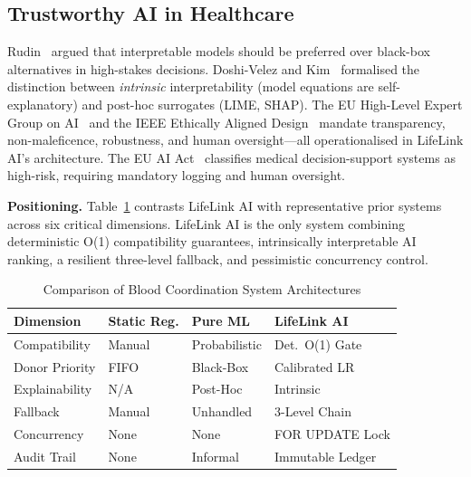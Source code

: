 \documentclass[conference]{IEEEtran}
\begin{document}
\subsection{Trustworthy AI in Healthcare}
Rudin~\cite{rudin2019} argued that interpretable models should be
preferred over black-box alternatives in high-stakes decisions.
Doshi-Velez and Kim~\cite{doshivelez2017} formalised the distinction
between \emph{intrinsic} interpretability (model equations are
self-explanatory) and post-hoc surrogates (LIME, SHAP). The EU
High-Level Expert Group on AI~\cite{eu_hleg2019} and the IEEE
Ethically Aligned Design~\cite{ieee_ead2019} mandate transparency,
non-maleficence, robustness, and human oversight---all operationalised
in LifeLink AI's architecture. The EU AI Act~\cite{eu_ai_act2021}
classifies medical decision-support systems as high-risk, requiring
mandatory logging and human oversight.

\textbf{Positioning.} Table~\ref{tab:comparison} contrasts LifeLink AI
with representative prior systems across six critical dimensions.
LifeLink AI is the only system combining deterministic O(1) compatibility
guarantees, intrinsically interpretable AI ranking, a resilient
three-level fallback, and pessimistic concurrency control.

\begin{table}[t]
  \centering
  \caption{Comparison of Blood Coordination System Architectures}
  \label{tab:comparison}
  \setlength{\tabcolsep}{3pt}
  \renewcommand{\arraystretch}{1.1}
  \begin{tabular}{@{}p{1.6cm}p{1.4cm}p{1.4cm}p{1.6cm}@{}}
    \toprule
    \textbf{Dimension} & \textbf{Static Reg.} & \textbf{Pure ML} & \textbf{LifeLink AI} \\
    \midrule
    Compatibility  & Manual         & Probabilistic      & Det.\ O(1) Gate \\
    Donor Priority & FIFO           & Black-Box          & Calibrated LR   \\
    Explainability & N/A            & Post-Hoc           & Intrinsic       \\
    Fallback       & Manual         & Unhandled          & 3-Level Chain   \\
    Concurrency    & None           & None               & FOR UPDATE Lock \\
    Audit Trail    & None           & Informal           & Immutable Ledger\\
    \bottomrule
  \end{tabular}
\end{table}
\end{document}

